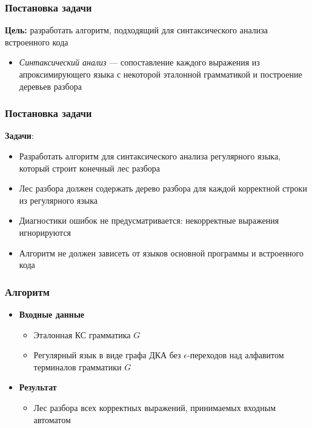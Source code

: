 \documentclass{beamer}
\begin{document}
\begin{frame}
  \transwipe[direction=90]
  \frametitle{Постановка задачи}
  \textbf{Цель:} разработать алгоритм, подходящий для синтаксического анализа 
встроенного кода

  \begin{itemize}
    \item \emph{Синтаксический анализ} --- сопоставление каждого выражения из 
апроксимирующего языка с некоторой эталонной грамматикой и построение деревьев разбора
  \end{itemize}
\end{frame}  

\begin{frame}
  \transwipe[direction=90]
  \frametitle{Постановка задачи}
  \textbf{Задачи}:
  \begin{itemize}
    \item Разработать алгоритм для синтаксического анализа регулярного языка, который строит конечный лес разбора
    \item Лес разбора должен содержать дерево разбора для каждой корректной строки из регулярного языка
    \item Диагностики ошибок не предусматривается: некорректные выражения игнорируются
    \item Алгоритм не должен зависеть от языков основной программы и встроенного кода
  \end{itemize}
\end{frame}
            
\begin{frame}
  \transwipe[direction=90]
  \frametitle{Алгоритм}
  \begin{itemize}
    \item \textbf{Входные данные} 
      \begin{itemize} 
        \item Эталонная КС грамматика $G$
        \item Регулярный язык в виде графа ДКА без $\epsilon$-переходов над алфавитом терминалов грамматики $G$
      \end{itemize}
    \item \textbf{Результат}
      \begin{itemize} 
        \item Лес разбора всех корректных выражений, принимаемых входным автоматом
    \end{itemize}
  \end{itemize}
\end{frame}
\end{document}
